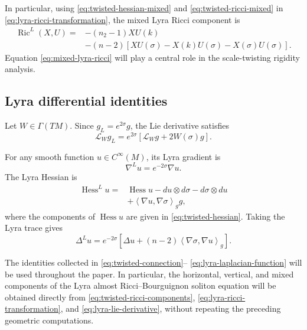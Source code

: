 \documentclass[a4paper,11pt]{article}
\theoremstyle{plain}
\numberwithin{equation}{section}
\begin{document}
In particular, using \eqref{eq:twisted-hessian-mixed} and
\eqref{eq:twisted-ricci-mixed} in
\eqref{eq:lyra-ricci-transformation}, the mixed Lyra Ricci
component is
\begin{align}
	\operatorname{Ric}^{L}(X,U)
	={}&
	-
	(n_{2}-1)XU(k)
	\nonumber\\
	&-
	(n-2)
	\left[
	XU(\sigma)
	-
	X(k)U(\sigma)
	-
	X(\sigma)U(\sigma)
	\right].
	\label{eq:mixed-lyra-ricci}
\end{align}
Equation \eqref{eq:mixed-lyra-ricci} will play a central role in
the scale-twisting rigidity analysis.

\subsection{Lyra differential identities}
\label{subsec:lyra-differential-identities}

Let \(W\in\Gamma(TM)\). Since \(g_{L}=e^{2\sigma}g\), the Lie
derivative satisfies
\begin{equation}
	\mathcal L_{W}g_{L}
	=
	e^{2\sigma}
	\left[
	\mathcal L_{W}g
	+
	2W(\sigma)g
	\right].
	\label{eq:lyra-lie-derivative}
\end{equation}

For any smooth function \(u\in C^{\infty}(M)\), its Lyra gradient
is
\begin{equation}
	\nabla^{L}u
	=
	e^{-2\sigma}\nabla u.
	\label{eq:lyra-gradient-function}
\end{equation}
The Lyra Hessian is
\begin{align}
	\operatorname{Hess}^{L}u
	={}&
	\operatorname{Hess}u
	-
	du\otimes d\sigma
	-
	d\sigma\otimes du
	\nonumber\\
	&+
	\left\langle\nabla u,\nabla\sigma\right\rangle_{g}g,
	\label{eq:lyra-hessian-function}
\end{align}
where the components of \(\operatorname{Hess}u\) are given in
\eqref{eq:twisted-hessian}. Taking the Lyra trace gives
\begin{equation}
	\Delta^{L}u
	=
	e^{-2\sigma}
	\left[
	\Delta u
	+
	(n-2)
	\left\langle\nabla\sigma,\nabla u\right\rangle_{g}
	\right].
	\label{eq:lyra-laplacian-function}
\end{equation}

The identities collected in
\eqref{eq:twisted-connection}--
\eqref{eq:lyra-laplacian-function} will be used throughout the
paper. In particular, the horizontal, vertical, and mixed
components of the Lyra almost Ricci--Bourguignon soliton equation
will be obtained directly from
\eqref{eq:twisted-ricci-components},
\eqref{eq:lyra-ricci-transformation}, and
\eqref{eq:lyra-lie-derivative}, without repeating the preceding
geometric computations.
\end{document}
